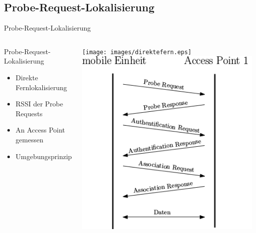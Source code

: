 \documentclass[18pt]{beamer}
\begin{document}
\subsection{Probe-Request-Lokalisierung}
\begin{frame}{Probe-Request-Lokalisierung}
	\begin{columns}
			\begin{block}{Probe-Request-Lokalisierung}
				\begin{itemize}
					\item Direkte Fernlokalisierung
					\item RSSI der Probe Requests
					\item An Access Point gemessen
					\item Umgebungsprinzip
				\end{itemize}
			\end{block}
			\centering
			\texttt{[image: images/direktefern.eps]}
			\includegraphics[width=\textwidth]{images/reupper.png}
	\end{columns}
\end{frame}
\end{document}
